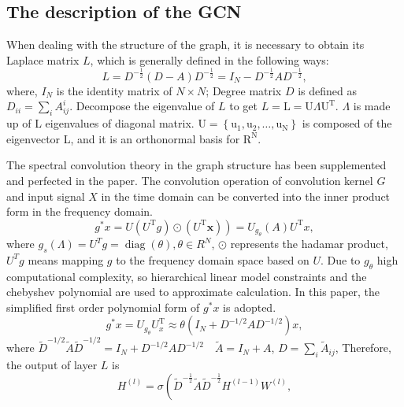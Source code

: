 \documentclass[journal,article,submit,moreauthors,pdftex]{Definitions/mdpi}
\begin{document}
\subsection{The description of the GCN} 
When dealing with the structure of the graph, it is necessary to obtain its Laplace matrix $L$, which is generally defined in the following ways:
\begin{equation}
    L=D^{-\frac{1}{2}}(D-A) D^{-\frac{1}{2}}=I_{N}-D^{-\frac{1}{2}} A D^{-\frac{1}{2}},
\end{equation}
where, $I_{N}$ is the identity matrix of $N×N$; Degree matrix $D$ is defined as $D_{i i}=\sum_{i} A_{i j}^{i}$. Decompose the eigenvalue of $L$ to get $L = \mathrm{L}=\mathrm{U} \Lambda \mathrm{U}^{\mathrm{T}}$. $\Lambda$ is made up of L eigenvalues of diagonal matrix. $\mathrm{U}=\left\{\mathrm{u}_{1}, \mathrm{u}_{2}, \ldots, \mathrm{u}_{\mathrm{N}}\right\}$ is composed of the eigenvector L, and it is an orthonormal basis for $\mathrm{R}^{\mathrm{N}}$.
\par The spectral convolution theory in the graph structure has been supplemented and perfected in the paper. The convolution operation of convolution kernel $G$ and input signal $X$ in the time domain can be converted into the inner product form in the frequency domain.
\begin{equation}
    \left.g^{*} x=U\left(U^{\mathrm{T}} g\right) \odot\left(U^{\mathrm{T}} \boldsymbol{x}\right)\right)=U_{g_{\theta}}(A) U^{\mathrm{T}} x,
\end{equation}
where $g_{s}(\Lambda)=U^{T} g=\operatorname{diag}(\theta), \theta \in R^{N}$, $\odot$ represents the hadamar product, $U^{T}g$ means mapping $g$ to the frequency domain space based on $U$. Due to $g_{\theta}$ high computational complexity, so hierarchical linear model constraints and the chebyshev polynomial are used to approximate calculation. In this paper, the simplified first order polynomial form of $g^{*} x$ is adopted.
\begin{equation}
    g^{*} x=U_{g_{\theta}} U_{x}^{\mathrm{T}} \approx \theta\left(I_{N}+D^{-1 / 2} A D^{-1 / 2}\right) x,
\end{equation}
where $\widetilde{D}^{-1 / 2} \widetilde{A} \widetilde{D}^{-1 / 2}=I_{N}+D^{-1 / 2} A D^{-1 / 2} \quad \tilde{A}=I_{N}+A $, ${D}=\sum_{i} \widetilde{A}_{i j}$, Therefore, the output of layer $L$ is
\begin{equation}
    H^{(l)}=\sigma\left(\widetilde{D}^{-\frac{1}{2}} \widetilde{A} \widetilde{D}^{-\frac{1}{2}} H^{(l-1)} W^{(l)}\right.,
\end{equation}
\end{document}
